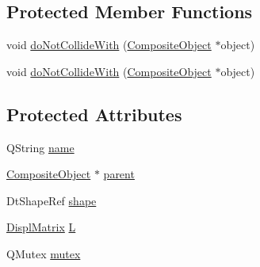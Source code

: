 \subsection*{Protected Member Functions}
\begin{DoxyCompactItemize}
\item 
void \hyperlink{class_robot_model_1_1_primitive_object_a8fc60e9e4a29b895d45871d842081605}{doNotCollideWith} (\hyperlink{class_robot_model_1_1_composite_object}{CompositeObject} $\ast$object)
\item 
void \hyperlink{class_robot_model_1_1_primitive_object_a498038d3817c1c24ddc5b8e9ca7afdf9}{doNotCollideWith} (\hyperlink{class_robot_model_1_1_composite_object}{CompositeObject} $\ast$object)
\end{DoxyCompactItemize}
\subsection*{Protected Attributes}
\begin{DoxyCompactItemize}
\item 
QString \hyperlink{class_robot_model_1_1_primitive_object_ae14d0349fba88a7de488c28934bf38ce}{name}
\item 
\hyperlink{class_robot_model_1_1_composite_object}{CompositeObject} $\ast$ \hyperlink{class_robot_model_1_1_primitive_object_a242ae58660af2bf8f7e3354f55486c47}{parent}
\item 
DtShapeRef \hyperlink{class_robot_model_1_1_primitive_object_ac0e31de5b780652446fdaa06eeec47d6}{shape}
\item 
\hyperlink{class_robot_model_1_1_displ_matrix}{DisplMatrix} \hyperlink{class_robot_model_1_1_primitive_object_a920286d17b47f5fb033de4418f4755a5}{L}
\item 
QMutex \hyperlink{class_robot_model_1_1_primitive_object_a04f683e6cd9c4acc4bd8436cd8c52e15}{mutex}
\end{DoxyCompactItemize}


